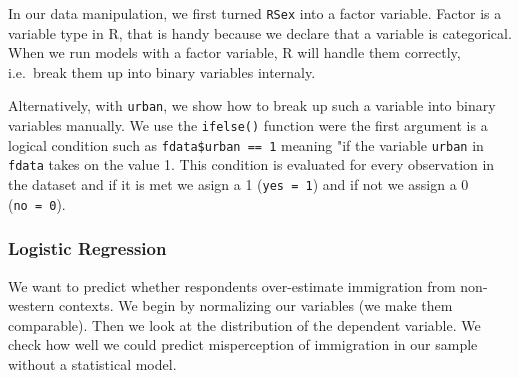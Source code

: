 \documentclass[]{article}
\newenvironment{Shaded}{\begin{snugshade}}{\end{snugshade}}
\newcommand{\DataTypeTok}[1]{\textcolor[rgb]{0.13,0.29,0.53}{#1}}
\newcommand{\DecValTok}[1]{\textcolor[rgb]{0.00,0.00,0.81}{#1}}
\newcommand{\KeywordTok}[1]{\textcolor[rgb]{0.13,0.29,0.53}{\textbf{#1}}}
\newcommand{\NormalTok}[1]{#1}
\newcommand{\OperatorTok}[1]{\textcolor[rgb]{0.81,0.36,0.00}{\textbf{#1}}}
\newcommand{\StringTok}[1]{\textcolor[rgb]{0.31,0.60,0.02}{#1}}
\begin{document}
\begin{Shaded}
\end{Shaded}

In our data manipulation, we first turned \texttt{RSex} into a factor variable. Factor is a variable type in R, that is handy because we declare that a variable is categorical. When we run models with a factor variable, R will handle them correctly, i.e.~break them up into binary variables internaly.

Alternatively, with \texttt{urban}, we show how to break up such a variable into binary variables manually. We use the \texttt{ifelse()} function were the first argument is a logical condition such as \texttt{fdata\$urban\ ==\ 1} meaning "if the variable \texttt{urban} in \texttt{fdata} takes on the value 1. This condition is evaluated for every observation in the dataset and if it is met we asign a 1 (\texttt{yes\ =\ 1}) and if not we assign a 0 (\texttt{no\ =\ 0}).

\hypertarget{logistic-regression}{%
\subsubsection{Logistic Regression}\label{logistic-regression}}

We want to predict whether respondents over-estimate immigration from non-western contexts. We begin by normalizing our variables (we make them comparable). Then we look at the distribution of the dependent variable. We check how well we could predict misperception of immigration in our sample without a statistical model.
\end{document}
